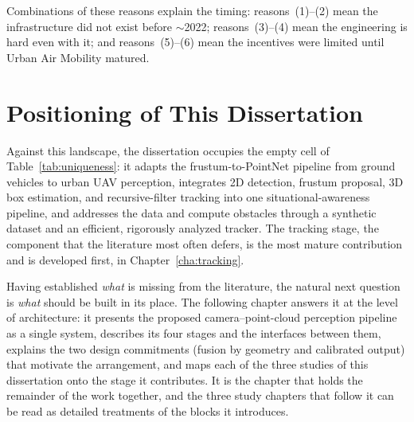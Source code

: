 Combinations of these reasons explain the timing: reasons~(1)--(2) mean the
infrastructure did not exist before $\sim$2022; reasons~(3)--(4) mean the
engineering is hard even with it; and reasons~(5)--(6) mean the incentives were
limited until Urban Air Mobility matured.

\section{Positioning of This Dissertation}

Against this landscape, the dissertation occupies the empty cell of
Table~\ref{tab:uniqueness}: it adapts the frustum-to-PointNet pipeline from
ground vehicles to urban UAV perception, integrates 2D detection, frustum
proposal, 3D box estimation, and recursive-filter tracking into one
situational-awareness pipeline, and addresses the data and compute obstacles
through a synthetic dataset and an efficient, rigorously analyzed tracker. The
tracking stage, the component that the literature most often
defers, is the most mature contribution and is developed first, in
Chapter~\ref{cha:tracking}.

Having established \emph{what} is missing from the literature, the natural next
question is \emph{what} should be built in its place. The following chapter
answers it at the level of architecture: it presents the proposed
camera--point-cloud perception pipeline as a single system, describes its four
stages and the interfaces between them, explains the two design commitments
(fusion by geometry and calibrated output) that motivate the arrangement, and maps
each of the three studies of this dissertation onto the stage it contributes. It
is the chapter that holds the remainder of the work together, and the three study
chapters that follow it can be read as detailed treatments of the blocks it
introduces.
